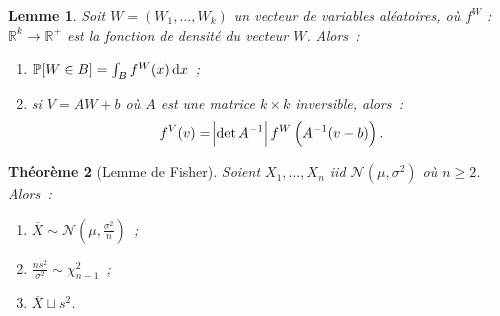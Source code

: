\documentclass{report}
\renewcommand{\P}{\mathbb P}
\newcommand{\Nms}{\mathcal N(\mu, \sigma^2)}
\newcommand{\R}{\mathbb R}
\newtheorem{thm}{Théorème}[chapter]
\newtheorem{lem}[thm]{Lemme}
\theoremstyle{definition}
\theoremstyle{remark}
\begin{document}
		\begin{lem}\label{lem:preFisher} Soit $W = (W_1, \ldots, W_k)$ un vecteur de variables aléatoires, où $f^W$ : $\R^k \to \R^+$ est la fonction de
		densité du vecteur $W$. Alors~:
		\begin{enumerate}
			\item $\P[W \in B] = \int_Bf^W(x)\dif x$~;
			\item si $V = AW + b$ où $A$ est une matrice $k \times k$ inversible, alors~:
				\[f^V(v) = \abs {\det A^{-1}}f^W\left(A^{-1}(v-b)\right).\]
		\end{enumerate}
		\end{lem}

		\begin{thm}[Lemme de Fisher] Soient $X_1, \ldots, X_n$ iid $\Nms$ où $n \geq 2$. Alors~:
		\begin{enumerate}
			\item[$(i)$]   $\overline X \sim \mathcal N(\mu, \frac {\sigma^2}n)$~;
			\item[$(ii)$]  $\frac {ns^2}{\sigma^2} \sim \chi^2_{n-1}$~;
			\item[$(iii)$] $\overline X \sqcup s^2$.
		\end{enumerate}
		\end{thm}
\end{document}
